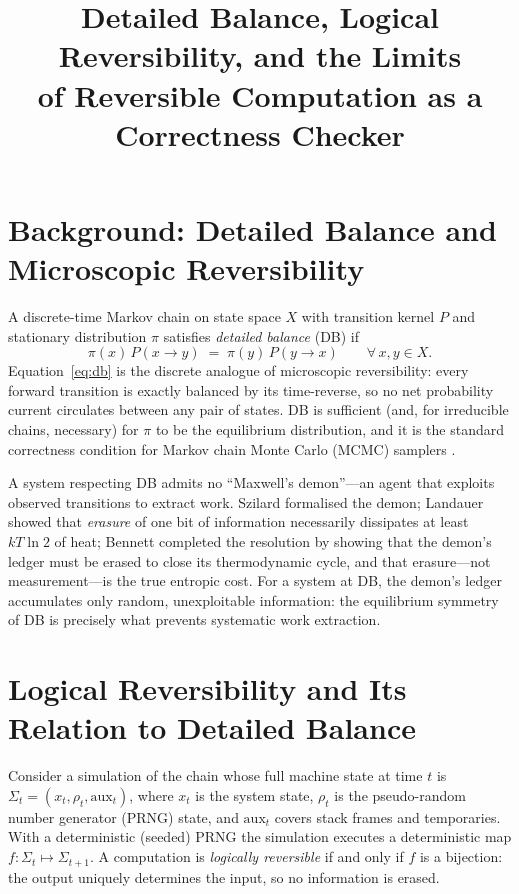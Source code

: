 \documentclass[11pt,a4paper]{article}
\title{\textbf{Detailed Balance, Logical Reversibility, and the Limits\\of Reversible Computation as a Correctness Checker}}
\author{}
\date{}
\begin{document}
\maketitle
\thispagestyle{empty}

\section{Background: Detailed Balance and Microscopic Reversibility}

A discrete-time Markov chain on state space $X$ with transition kernel $P$ and stationary
distribution $\pi$ satisfies \emph{detailed balance} (DB) if
\begin{equation}
  \pi(x)\,P(x \to y) \;=\; \pi(y)\,P(y \to x) \qquad \forall\, x,y \in X.
  \label{eq:db}
\end{equation}
Equation~\eqref{eq:db} is the discrete analogue of microscopic reversibility: every forward
transition is exactly balanced by its time-reverse, so no net probability current circulates
between any pair of states.  DB is sufficient (and, for irreducible chains, necessary) for $\pi$
to be the equilibrium distribution, and it is the standard correctness condition for Markov chain
Monte Carlo (MCMC) samplers \cite{hastings1970, kelly1979}.

A system respecting DB admits no ``Maxwell's demon''---an agent that exploits observed transitions
to extract work.  Szilard \cite{szilard1929} formalised the demon; Landauer \cite{landauer1961}
showed that \emph{erasure} of one bit of information necessarily dissipates at least $kT\ln 2$ of
heat; Bennett \cite{bennett1973,bennett1982} completed the resolution by showing that the demon's
ledger must be erased to close its thermodynamic cycle, and that erasure---not measurement---is the
true entropic cost.  For a system at DB, the demon's ledger accumulates only random, unexploitable
information: the equilibrium symmetry of DB is precisely what prevents systematic work extraction.

\section{Logical Reversibility and Its Relation to Detailed Balance}

Consider a simulation of the chain whose full machine state at time $t$ is
$\Sigma_t = (x_t, \rho_t, \mathrm{aux}_t)$, where $x_t$ is the system state, $\rho_t$ is the
pseudo-random number generator (PRNG) state, and $\mathrm{aux}_t$ covers stack frames and
temporaries.  With a deterministic (seeded) PRNG the simulation executes a deterministic map
$f\colon\Sigma_t \mapsto \Sigma_{t+1}$.  A computation is \emph{logically reversible}
\cite{bennett1973} if and only if $f$ is a bijection: the output uniquely determines the input,
so no information is erased.
\end{document}
